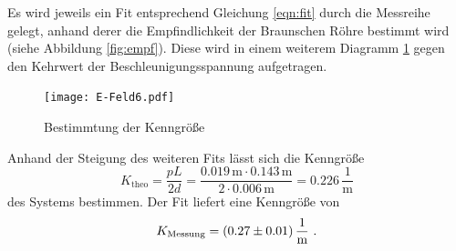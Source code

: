 Es wird jeweils ein Fit entsprechend Gleichung \ref{eqn:fit} durch die Messreihe gelegt, anhand derer die Empfindlichkeit der Braunschen Röhre bestimmt wird (siehe Abbildung \ref{fig:empf}). Diese wird in einem weiterem Diagramm \ref{fig:K} gegen den Kehrwert der Beschleunigungsspannung aufgetragen.
\begin{figure}
  \centering
  \texttt{[image: E-Feld6.pdf]}
  \caption{Bestimmtung der Kenngröße}
  \label{fig:K}
\end{figure}
Anhand der Steigung des weiteren Fits lässt sich die Kenngröße
\begin{equation}
  K_\text{theo} = \frac{p L}{2 d} = \frac{0.019 \, \text{m} \cdot 0.143 \, \text{m}}{2 \cdot 0.006 \, \text{m}} = 0.226 \, \frac{1}{\text{m}}
  \label{eqn:Ktheo}
\end{equation}
des Systems bestimmen. Der Fit liefert eine Kenngröße von
\begin{equation}
  K_\text{Messung} = (\num{0.27 +- 0.01}) \, \frac{1}{\text{m}} \ .
  \label{Kmess}
\end{equation}
